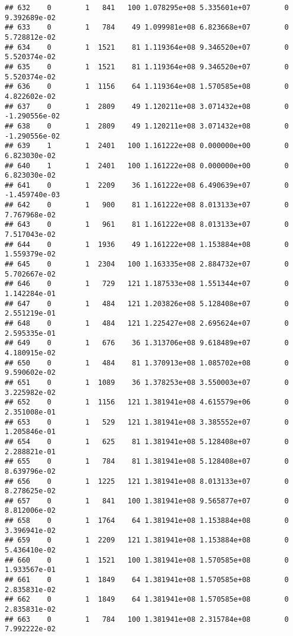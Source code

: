 \documentclass[
]{article}
\begin{document}
\begin{enumerate}
\begin{verbatim}
## 632    0        1   841   100 1.078295e+08 5.335601e+07        0  9.392689e-02
## 633    0        1   784    49 1.099981e+08 6.823668e+07        0  5.728812e-02
## 634    0        1  1521    81 1.119364e+08 9.346520e+07        0  5.520374e-02
## 635    0        1  1521    81 1.119364e+08 9.346520e+07        0  5.520374e-02
## 636    0        1  1156    64 1.119364e+08 1.570585e+08        0  4.822602e-02
## 637    0        1  2809    49 1.120211e+08 3.071432e+08        0 -1.290556e-02
## 638    0        1  2809    49 1.120211e+08 3.071432e+08        0 -1.290556e-02
## 639    1        1  2401   100 1.161222e+08 0.000000e+00        0  6.823030e-02
## 640    1        1  2401   100 1.161222e+08 0.000000e+00        0  6.823030e-02
## 641    0        1  2209    36 1.161222e+08 6.490639e+07        0 -1.459740e-03
## 642    0        1   900    81 1.161222e+08 8.013133e+07        0  7.767968e-02
## 643    0        1   961    81 1.161222e+08 8.013133e+07        0  7.517043e-02
## 644    0        1  1936    49 1.161222e+08 1.153884e+08        0  1.559379e-02
## 645    0        1  2304   100 1.163335e+08 2.884732e+07        0  5.702667e-02
## 646    0        1   729   121 1.187533e+08 1.551344e+07        0  1.142284e-01
## 647    0        1   484   121 1.203826e+08 5.128408e+07        0  2.551219e-01
## 648    0        1   484   121 1.225427e+08 2.695624e+07        0  2.595335e-01
## 649    0        1   676    36 1.313706e+08 9.618489e+07        0  4.180915e-02
## 650    0        1   484    81 1.370913e+08 1.085702e+08        0  9.590602e-02
## 651    0        1  1089    36 1.378253e+08 3.550003e+07        0  3.225982e-02
## 652    0        1  1156   121 1.381941e+08 4.615579e+06        0  2.351008e-01
## 653    0        1   529   121 1.381941e+08 3.385552e+07        0  1.205846e-01
## 654    0        1   625    81 1.381941e+08 5.128408e+07        0  2.288821e-01
## 655    0        1   784    81 1.381941e+08 5.128408e+07        0  8.639796e-02
## 656    0        1  1225   121 1.381941e+08 8.013133e+07        0  8.278625e-02
## 657    0        1   841   100 1.381941e+08 9.565877e+07        0  8.812006e-02
## 658    0        1  1764    64 1.381941e+08 1.153884e+08        0  3.396941e-02
## 659    0        1  2209   121 1.381941e+08 1.153884e+08        0  5.436410e-02
## 660    0        1  1521   100 1.381941e+08 1.570585e+08        0  1.933567e-01
## 661    0        1  1849    64 1.381941e+08 1.570585e+08        0  2.835831e-02
## 662    0        1  1849    64 1.381941e+08 1.570585e+08        0  2.835831e-02
## 663    0        1   784   100 1.381941e+08 2.315784e+08        0  7.992222e-02

\end{verbatim}
\end{enumerate}
\end{document}

